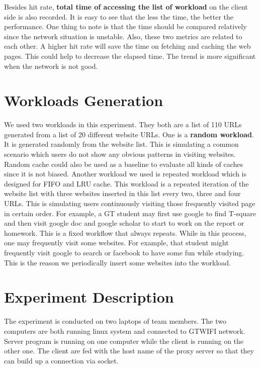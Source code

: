 \documentclass[paper=a4, fontsize=11pt]{scrartcl} %
\numberwithin{equation}{section} %
\numberwithin{figure}{section} %
\numberwithin{table}{section} %
\begin{document}
\vspace{1em}

Besides hit rate, \textbf{total time of accessing the list of workload}
on the client side is also recorded. It is easy to see that the less the time, the better the performance. One thing to note is that the time should be compared relatively since the network situation is unstable.
Also, these two metrics are related to each other. A higher hit rate will save the time on fetching and caching the web pages. This could help to decrease the elapsed time. The trend is more significant when the network is not good. 

\section{Workloads Generation}

We used two workloads in this experiment. They both are a list of 110 URLs generated from a list of 20 different website URLs. One is a 
\textbf{random workload}. It is generated randomly from the website list. This is simulating a common scenario which users do not show any obvious patterns in visiting websites. Random cache could also be used as a baseline to evaluate all kinds of caches since it is not biased. Another workload we used is repeated workload which is designed for FIFO and LRU cache. This workload is a repeated iteration of the website list with three websites inserted in this list every two, three and four URLs. This is simulating users continuously visiting those frequently visited page in certain order. For example, a GT student may first use google to find T-square and then visit google doc and google scholar to start to work on the report or homework. This is a fixed workflow that always repeats. While in this process, one may frequently visit some websites. For example, that student might frequently visit google to search or facebook to have some fun while studying. This is the reason we periodically insert some websites into the workload.  
    

\section{Experiment Description}

The experiment is conducted on two laptops of team members. The two computers are both running linux system and connected to GTWIFI network. Server program is running on one computer while the client is running on the other one. The client are fed with the host name of the proxy server so that they can build up a connection via socket. 
\end{document}
